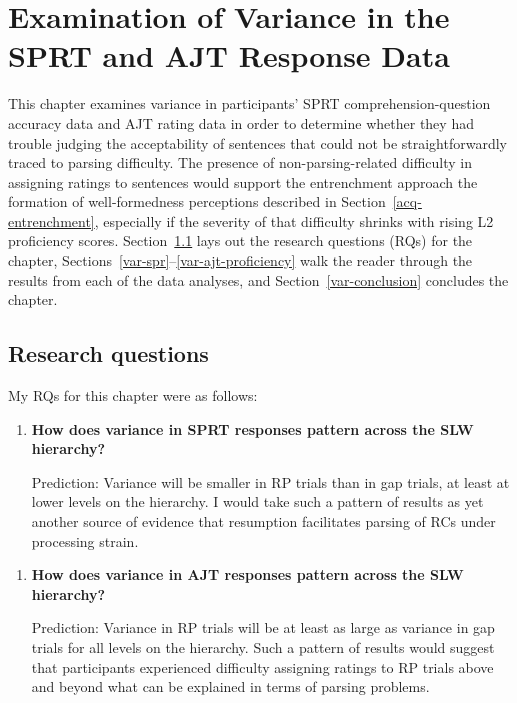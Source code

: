 
\chapter{Examination of Variance in the SPRT and AJT Response Data}\label{ch-variance}

This chapter examines variance in participants' SPRT comprehension-question accuracy data and AJT rating data in order to determine whether they had trouble judging the acceptability of sentences that could not be straightforwardly traced to parsing difficulty. The presence of non-parsing-related difficulty in assigning ratings to sentences would support the entrenchment approach the formation of well-formedness perceptions described in Section~\ref{acq-entrenchment}, especially if the severity of that difficulty shrinks with rising L2 proficiency scores. Section~\ref{var-rq} lays out the research questions (RQs) for the chapter, Sections~\ref{var-spr}--\ref{var-ajt-proficiency} walk the reader through the results from each of the data analyses, and Section~\ref{var-conclusion} concludes the chapter.

\section{Research questions}\label{var-rq}

My RQs for this chapter were as follows:

\begin{enumerate}[\bfseries RQ1:,itemsep=5pt]
\item {\bfseries How does variance in SPRT responses pattern across the SLW hierarchy?}\par\nobreak
Prediction: Variance will be smaller in RP trials than in gap trials, at least at lower levels on the hierarchy. I would take such a pattern of results as yet another source of evidence that resumption facilitates parsing of RCs under processing strain.
\end{enumerate}\vspace{5pt}

\begin{enumerate}[\bfseries RQ2:,itemsep=5pt]
\item {\bfseries How does variance in AJT responses pattern across the SLW hierarchy?}\par\nobreak
Prediction: Variance in RP trials will be at least as large as variance in gap trials for all levels on the hierarchy. Such a pattern of results would suggest that participants experienced difficulty assigning ratings to RP trials above and beyond what can be explained in terms of parsing problems.
\end{enumerate}\vspace{5pt}

